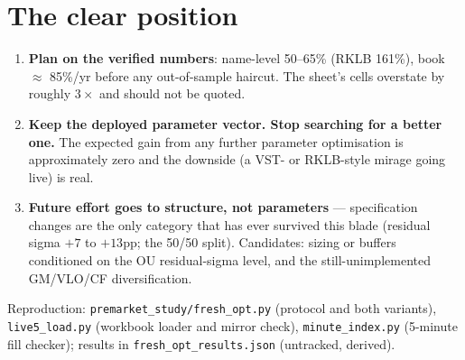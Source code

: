 \documentclass[11pt,a4paper]{article}
\begin{document}
\section*{The clear position}

\begin{enumerate}
  \item \textbf{Plan on the verified numbers}: name-level 50--65\% (RKLB 161\%),
        book $\approx$ 85\%/yr before any out-of-sample haircut. The sheet's cells
        overstate by roughly $3\times$ and should not be quoted.
  \item \textbf{Keep the deployed parameter vector. Stop searching for a better
        one.} The expected gain from any further parameter optimisation is
        approximately zero and the downside (a VST- or RKLB-style mirage going
        live) is real.
  \item \textbf{Future effort goes to structure, not parameters} --- specification
        changes are the only category that has ever survived this blade (residual
        sigma $+7$ to $+13$pp; the 50/50 split). Candidates: sizing or buffers
        conditioned on the OU residual-sigma level, and the still-unimplemented
        GM/VLO/CF diversification.
\end{enumerate}

Reproduction: \texttt{premarket\_study/fresh\_opt.py} (protocol and both variants),
\texttt{live5\_load.py} (workbook loader and mirror check),
\texttt{minute\_index.py} (5-minute fill checker); results in
\texttt{fresh\_opt\_results.json} (untracked, derived).
\end{document}
